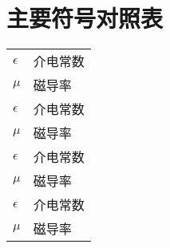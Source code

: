 
\chapter{主要符号对照表}
\label{chap:symb}
\begin{tabular}{ll}

 \hspace{2em}$\epsilon$       & \hspace{5em}介电常数 \\
 \hspace{2em}$\mu$ \qquad     & \hspace{5em}磁导率 \\
  \hspace{2em}$\epsilon$       & \hspace{5em}介电常数 \\
 \hspace{2em}$\mu$ \qquad     & \hspace{5em}磁导率 \\
 \hspace{2em}$\epsilon$       & \hspace{5em}介电常数 \\
 \hspace{2em}$\mu$ \qquad     & \hspace{5em}磁导率 \\
 \hspace{2em}$\epsilon$       & \hspace{5em}介电常数 \\
 \hspace{2em}$\mu$ \qquad     & \hspace{5em}磁导率 \\


\end{tabular}
